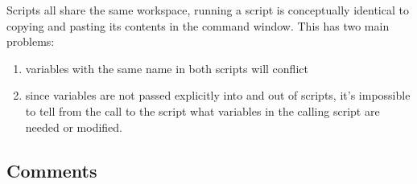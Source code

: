 \documentclass[12pt]{article}
\begin{document}
	Scripts all share the same workspace, running a script is conceptually identical to copying and pasting its contents in the command window. This has two main problems: 
	
	\begin{enumerate}
	\item variables with the same name in both scripts will conflict
	\item since variables are not passed explicitly into and out of scripts, it's impossible to tell from the call to the script what variables in the calling script are needed or modified.
	\end{enumerate}
	
\subsection{Comments}
\end{document}
